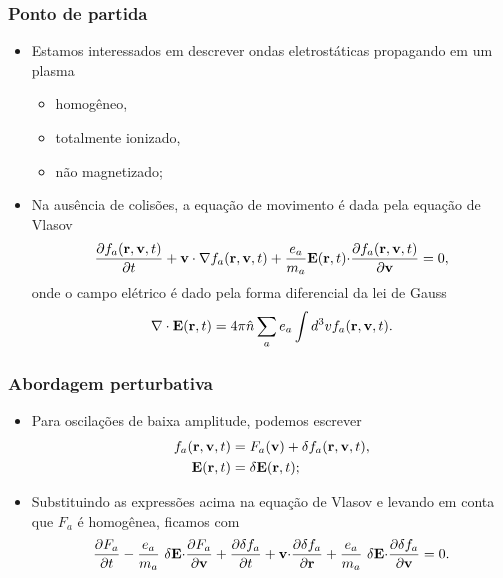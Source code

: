 \documentclass[10pt,aspectratio=1610,lualatex]{beamer}
\begin{document}
\begin{frame}
  \frametitle{Ponto de partida}
  \begin{itemize}
    \item Estamos interessados em descrever ondas eletrostáticas
    propagando em um plasma
    \begin{itemize}
      \item homogêneo,
      \item totalmente ionizado,
      \item não magnetizado;
    \end{itemize}
    \vspace{0.3cm}
    \pause
    \item Na ausência de colisões, a equação de movimento é dada
    pela equação de Vlasov
    \begin{equation}
  \label{vlasov-nl}
  \frac{\partial f_a({\bf r}, {\bf v},t)}{\partial t}
  +{\bf v \cdot \nabla}f_a({\bf r}, {\bf v},t)
  +\frac{e_a}{m_a}{\bf E}({\bf r},t){\bf \cdot}
  \frac{\partial f_a({\bf r},{\bf v},t)}{\partial \bf v}=0,
    \end{equation}
    onde o campo elétrico é dado pela forma diferencial da lei de Gauss
    \begin{equation}
   {\bf \nabla \cdot E}({\bf r},t)
   =4\pi \hat n \sum_a e_a\int d^3 v f_a({\bf r}, {\bf v},t). 
  \end{equation}
  \end{itemize}
\end{frame}

\begin{frame}
  \frametitle{Abordagem perturbativa}
  \begin{itemize}
    \item Para oscilações de baixa amplitude, podemos escrever
    \begin{equation*}
      \begin{split}
	f_a({\bf r}, {\bf v},t)&=F_a({\bf v})
	+\delta f_a({\bf r}, {\bf v},t),\\
      {\bf E}({\bf r},t)&=\delta {\bf E}({\bf r},t);
    \end{split}
    \end{equation*}
    \vspace{0.2cm}
    \pause
    \item Substituindo as expressões acima na equação de Vlasov
    e levando em conta que $F_a$ é homogênea, ficamos com
    \begin{equation}
      \frac{\partial F_a}{\partial t}-\frac{e_a}{m_a}\
      \delta {\bf E \cdot} \frac{\partial F_a}{\partial \bf v}
      +\frac{\partial \delta f_a}{\partial t}+{\bf v \cdot}
      \frac{\partial \delta f_a}{\partial {\bf r}}
      +\frac{e_a}{m_a}\ \delta {\bf E \cdot}
      \frac{\partial \delta f_a}{\partial \bf v}=0.
      \label{turb_ave_vlasov}
    \end{equation}
  \end{itemize}
\end{frame}
\end{document}
